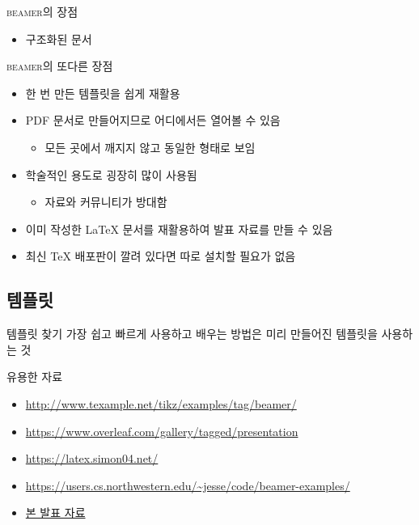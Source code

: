 \documentclass[compress]{beamer}
\begin{document}
\begin{frame}[fragile]{\textsc{beamer}의 장점}
\begin{itemize}
    \item \alert{구조화된 문서}
  \end{itemize}
\end{frame}

\begin{frame}{\textsc{beamer}의 또다른 장점}
  \begin{itemize}
    \item 한 번 만든 템플릿을 쉽게 재활용
    \item PDF 문서로 만들어지므로 어디에서든 열어볼 수 있음
      \begin{itemize}
        \item \alert{모든 곳에서 깨지지 않고 동일한 형태로 보임}
      \end{itemize}
    \item 학술적인 용도로 굉장히 많이 사용됨
      \begin{itemize}
        \item 자료와 커뮤니티가 방대함
      \end{itemize}
    \item \alert{이미 작성한 \LaTeX{} 문서를 재활용}하여 발표 자료를 만들 수 있음
    \item 최신 \TeX{} 배포판이 깔려 있다면 따로 설치할 필요가 없음
  \end{itemize}
\end{frame}

\subsection{템플릿}
\begin{frame}{템플릿 찾기}
   가장 쉽고 빠르게 사용하고 배우는 방법은 미리 만들어진 템플릿을
  사용하는 것

  \begin{block}{유용한 자료}
    \begin{itemize}
      \item \url{http://www.texample.net/tikz/examples/tag/beamer/}
      \item \url{https://www.overleaf.com/gallery/tagged/presentation}
      \item \url{https://latex.simon04.net/}
      \item \url{https://users.cs.northwestern.edu/~jesse/code/beamer-examples/}
      \item \href{https://github.com/Zeta611/beamer-tutorial-latex-workshop-2020}{본 발표 자료}
    \end{itemize}
  \end{block}
\end{frame}
\end{document}
